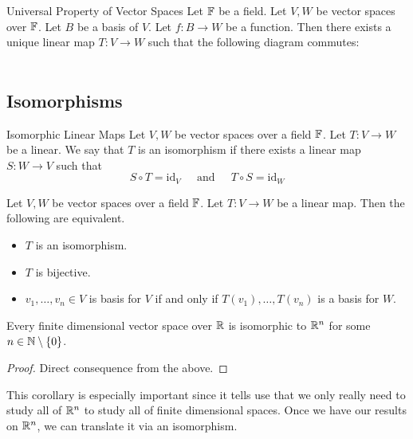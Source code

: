 \documentclass[a4paper]{article}
\begin{document}
\begin{prp}{Universal Property of Vector Spaces}{} Let $\mathbb{F}$ be a field. Let $V,W$ be vector spaces over $\mathbb{F}$. Let $B$ be a basis of $V$. Let $f:B\to W$ be a function. Then there exists a unique linear map $T:V\to W$ such that the following diagram commutes: \\
 \\
\end{prp}

\subsection{Isomorphisms}
\begin{defn}{Isomorphic Linear Maps}{} Let $V,W$ be vector spaces over a field $\mathbb{F}$. Let $T:V\to W$ be a linear. We say that $T$ is an isomorphism if there exists a linear map $S:W\to V$ such that $$S\circ T=\text{id}_V\;\;\;\;\text{ and }\;\;\;\;T\circ S=\text{id}_W$$
\end{defn}

\begin{prp}{}{} Let $V,W$ be vector spaces over a field $\mathbb{F}$. Let $T:V\to W$ be a linear map. Then the following are equivalent. 
\begin{itemize}
\item $T$ is an isomorphism. 
\item $T$ is bijective. 
\item $v_1,\dots,v_n\in V$ is basis for $V$ if and only if $T(v_1),\dots,T(v_n)$ is a basis for $W$. 
\end{itemize}
\end{prp}

\begin{crl}{}{} Every finite dimensional vector space over $\mathbb{R}$ is isomorphic to $\mathbb{R}^n$ for some $n\in\mathbb{N}\setminus\{0\}$. 
\begin{proof} Direct consequence from the above. 
\end{proof}
\end{crl}

This corollary is especially important since it tells use that we only really need to study all of $\mathbb{R}^n$ to study all of finite dimensional spaces. Once we have our results on $\mathbb{R}^n$, we can translate it via an isomorphism. 
\end{document}
